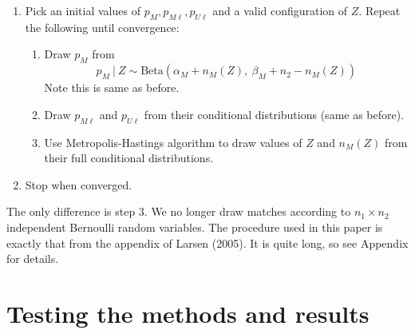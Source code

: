 \documentclass[11pt,reqno]{amsart}
\begin{document}
\begin{enumerate} 
\item Pick an initial values of $p_M, p_{M\ell}, p_{U\ell}$ and a valid configuration of $Z$.  Repeat the following until convergence:
\begin{enumerate} 
\item Draw $p_M$ from $$ p_M\ |\ Z \sim \text{Beta}(\alpha_M + n_{M}(Z),\ \beta_M + n_{2} - n_{M}(Z)) $$ Note this is same as before. 

\item  Draw $p_{M\ell}$ and $p_{U\ell}$ from their conditional distributions (same as before).

\item Use Metropolis-Hastings algorithm to draw values of $Z$ and $n_{M}(Z)$ from their full conditional distributions. 

\end{enumerate}

\item Stop when converged. 
\end{enumerate}
The only difference is step 3.  We no longer draw matches according to $n_1\times n_2$ independent Bernoulli random variables.  The procedure used in this paper is exactly that from the appendix of Larsen (2005).  It is quite long, so see Appendix for details. 


\section{Testing the methods and results}
\end{document}
